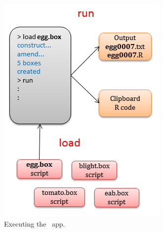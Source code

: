 \begin{figure}
\centering
\includegraphics[scale=0.8]{graphics/workflow-execute}
\caption{Executing the \US\ app.}
\label{fig:workflow-execute}
\end{figure}

